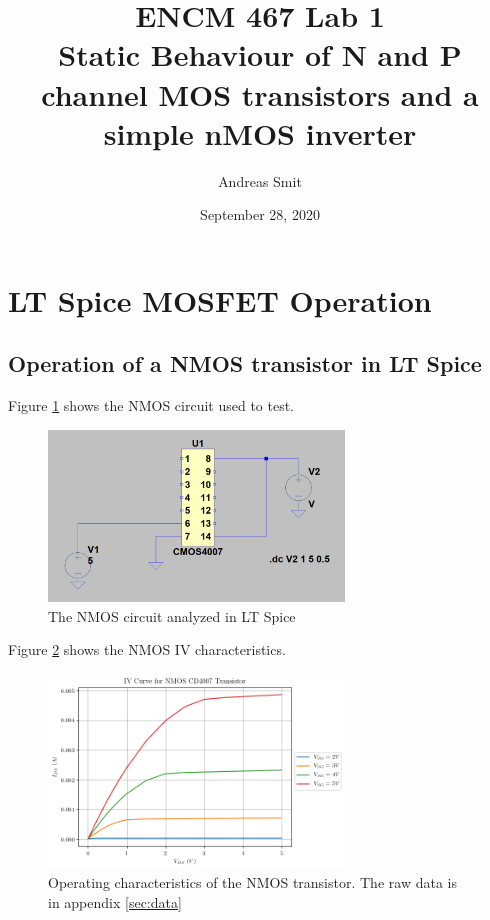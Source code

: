 \documentclass[titlepage, 12pt]{article}
\title{ENCM 467 Lab 1\\Static Behaviour of N and P channel MOS
transistors and a simple nMOS inverter}
\author{Andreas Smit}
\date{September 28, 2020}
\begin{document}
    \maketitle

    \section{LT Spice MOSFET Operation}
    \subsection{Operation of a NMOS transistor in LT Spice}
    Figure \ref{fig:part_1a_circ} shows the NMOS circuit used to test.
    \begin{figure}
        \centering
        \includegraphics[width=0.7\textwidth]{figures/nmos_circuit.png}
        \caption{The NMOS circuit analyzed in LT Spice}
        \label{fig:part_1a_circ}
    \end{figure}
    Figure \ref{fig:part_1a_fig} shows the NMOS IV characteristics.
    \begin{figure}[H]
        \centering
        \includegraphics[width= 0.7\textwidth]{figures/part_1_nmos.png}
        \caption{Operating characteristics of the NMOS transistor. The
        raw data is in appendix \ref{sec:data}}
        \label{fig:part_1a_fig}
    \end{figure}
\end{document}
